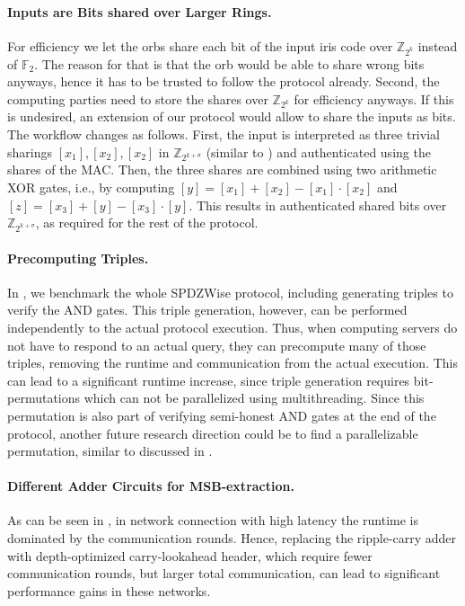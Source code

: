 \documentclass[a4paper,11pt,
]{article}
\newcommand{\F}{\ensuremath{\mathbb{F}}\xspace}
\newcommand{\Z}{\ensuremath{\mathbb{Z}}\xspace}
\newcommand{\shared}[1]{\ensuremath{[{#1}]}}
\begin{document}
\paragraph{Inputs are Bits shared over Larger Rings.}
For efficiency we let the orbs share each bit of the input iris code over $\Z_{2^k}$ instead of $\F_2$. The reason for that is that the orb would be able to share wrong bits anyways, hence it has to be trusted to follow the protocol already. Second, the computing parties need to store the shares over $\Z_{2^k}$ for efficiency anyways.
If this is undesired, an extension of our protocol would allow to share the inputs as bits. The workflow changes as follows. First, the input is interpreted as three trivial sharings $\shared{x_1}, \shared{x_2}, \shared{x_2}$ in $\Z_{2^{k + \sigma}}$ (similar to ) and authenticated using the shares of the MAC. Then, the three shares are combined using two arithmetic XOR gates, i.e., by computing $\shared{y} = \shared{x_1} + \shared{x_2} - \shared{x_1} \cdot \shared{x_2}$ and $\shared{z} = \shared{x_3} + \shared{y} - \shared{x_3} \cdot \shared{y}$. This results in authenticated shared bits over $\Z_{2^{k + \sigma}}$, as required for the rest of the protocol.

\paragraph{Precomputing Triples.}
In , we benchmark the whole SPDZWise protocol, including generating triples to verify the AND gates. This triple generation, however, can be performed independently to the actual protocol execution. Thus, when computing servers  do not have to respond to an actual query, they can precompute many of those triples, removing the runtime and communication from the actual execution. This can lead to a significant runtime increase, since triple generation requires bit-permutations which can not be parallelized using multithreading. Since this permutation is also part of verifying semi-honest AND gates at the end of the protocol, another future research direction could be to find a parallelizable permutation, similar to discussed in \cite{DBLP:conf/sp/ArakiBFLLNOWW17}.

\paragraph{Different Adder Circuits for MSB-extraction.}
As can be seen in , in network connection with high latency the runtime is dominated by the communication rounds. Hence, replacing the ripple-carry adder with depth-optimized carry-lookahead header, which require fewer communication rounds, but larger total communication, can lead to significant performance gains in these networks.
\end{document}
